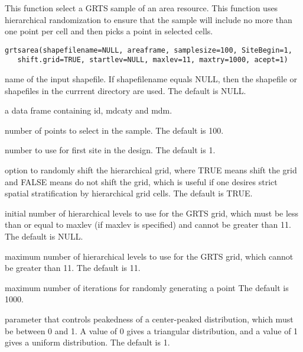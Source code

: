 \begin{Description}\relax
This function select a GRTS sample of an area resource.  This function uses
hierarchical randomization to ensure that the sample will include no more
than one point per cell and then picks a point in selected cells.
\end{Description}
\begin{Usage}
\begin{verbatim}
grtsarea(shapefilename=NULL, areaframe, samplesize=100, SiteBegin=1,
   shift.grid=TRUE, startlev=NULL, maxlev=11, maxtry=1000, acept=1)
\end{verbatim}
\end{Usage}
\begin{Arguments}
\begin{ldescription}
\item[\code{shapefilename}] name of the input shapefile.  If shapefilename equals
NULL, then the shapefile or shapefiles in the currrent directory are used.
The default is NULL.
\item[\code{areaframe}] a data frame containing id, mdcaty and mdm.
\item[\code{samplesize}] number of points to select in the sample.  The default is
100.
\item[\code{SiteBegin}] number to use for first site in the design.  The default is
1.
\item[\code{shift.grid}] option to randomly shift the hierarchical grid, where TRUE
means shift the grid and FALSE means do not shift the grid, which is
useful if one desires strict spatial stratification by hierarchical grid
cells.  The default is TRUE.
\item[\code{startlev}] initial number of hierarchical levels to use for the GRTS
grid, which must be less than or equal to maxlev (if maxlev is specified)
and cannot be greater than 11.  The default is NULL.
\item[\code{maxlev}] maximum number of hierarchical levels to use for the GRTS grid,
which cannot be greater than 11.  The default is 11.
\item[\code{maxtry}] maximum number of iterations for randomly generating a point
The default is 1000.
\item[\code{acept}] parameter that controls peakedness of a center-peaked
distribution, which must be between 0 and 1.  A value of 0 gives a
triangular distribution, and a value of 1 gives a uniform
distribution.  The default is 1.
\end{ldescription}
\end{Arguments}
